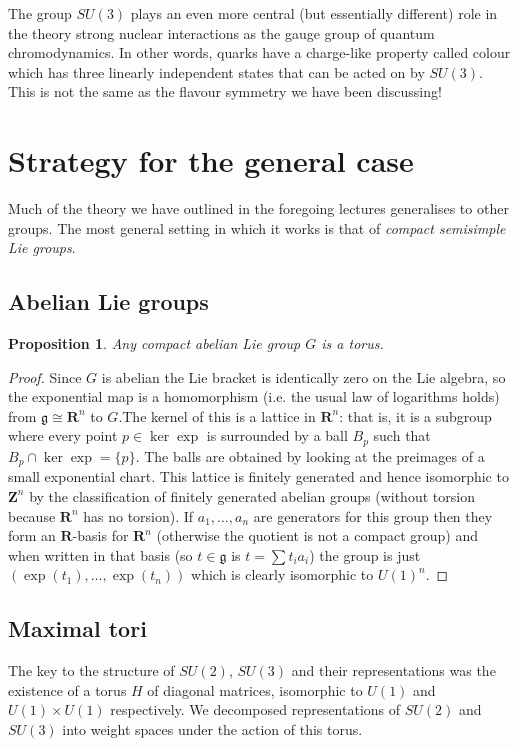 \documentclass[12pt]{article}
\newcommand{\RR}{\mathbf{R}}
\newcommand{\ZZ}{\mathbf{Z}}
\newtheorem{prp}[thm]{Proposition}
\theoremstyle{definition}
\theoremstyle{check}
\theoremstyle{remark}
\theoremstyle{TheoremNum}
\begin{document}
The group $SU(3)$ plays an even more central (but essentially different) role in the theory strong nuclear interactions as the gauge group of quantum chromodynamics. In other words, quarks have a charge-like property called colour which has three linearly independent states that can be acted on by $SU(3)$. This is not the same as the flavour symmetry we have been discussing!

\section{Strategy for the general case}


Much of the theory we have outlined in the foregoing lectures generalises to other groups. The most general setting in which it works is that of {\em compact semisimple Lie groups}.


\subsection{Abelian Lie groups}

\begin{prp}
Any compact abelian Lie group $G$ is a torus.
\end{prp}
\begin{proof}
Since $G$ is abelian the Lie bracket is identically zero on the Lie algebra, so the exponential map is a homomorphism (i.e. the usual law of logarithms holds) from $\mathfrak{g}\cong\RR^n$ to $G$.The kernel of this is a lattice in $\RR^n$: that is, it is a subgroup where every point $p\in\ker\exp$ is surrounded by a ball $B_p$ such that $B_p\cap\ker\exp=\{p\}$. The balls are obtained by looking at the preimages of a small exponential chart. This lattice is finitely generated and hence isomorphic to $\ZZ^n$ by the classification of finitely generated abelian groups (without torsion because $\RR^n$ has no torsion). If $a_1,\ldots,a_n$ are generators for this group then they form an $\RR$-basis for $\RR^n$ (otherwise the quotient is not a compact group) and when written in that basis (so $t\in\mathfrak{g}$ is $t=\sum t_ia_i$) the group is just $(\exp(t_1),\ldots,\exp(t_n))$ which is clearly isomorphic to $U(1)^n$.
\end{proof}

\subsection{Maximal tori}

The key to the structure of $SU(2)$, $SU(3)$ and their representations was the existence of a torus $H$ of diagonal matrices, isomorphic to $U(1)$ and $U(1)\times U(1)$ respectively. We decomposed representations of $SU(2)$ and $SU(3)$ into weight spaces under the action of this torus.
\end{document}

